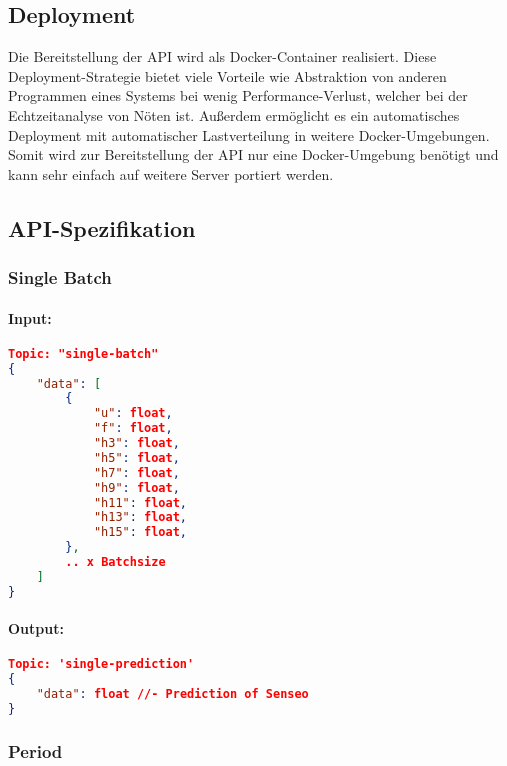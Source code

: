     \subsection{Deployment}
        Die Bereitstellung der API wird als Docker-Container realisiert.
        Diese Deployment-Strategie bietet viele Vorteile wie Abstraktion von anderen Programmen eines Systems bei wenig Performance-Verlust, welcher bei der Echtzeitanalyse von Nöten ist.
        Außerdem ermöglicht es ein automatisches Deployment mit automatischer Lastverteilung in weitere Docker-Umgebungen.
        Somit wird zur Bereitstellung der API nur eine Docker-Umgebung benötigt und kann sehr einfach auf weitere Server portiert werden.
                

    \subsection{API-Spezifikation}\label{API-Spezifikation}
        \subsubsection{Single Batch}
        \paragraph{Input:}

            \begin{lstlisting}[language=json,firstnumber=1]
Topic: "single-batch"
{
    "data": [
        {
            "u": float,
            "f": float,
            "h3": float,
            "h5": float,
            "h7": float,
            "h9": float,
            "h11": float,
            "h13": float,
            "h15": float,
        },
        .. x Batchsize
    ]
}
            \end{lstlisting}
        
            \paragraph{Output:}
        
            \begin{lstlisting}[language=json,firstnumber=1]
Topic: 'single-prediction'
{
    "data": float //- Prediction of Senseo
}
            \end{lstlisting}
    
        \subsubsection{Period}
